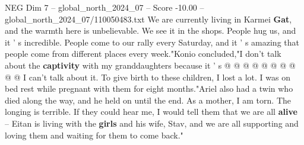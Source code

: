 \begin{textsample}{NEG Dim 7 – global\_north\_2024\_07 – Score -10.00 – global\_north\_2024\_07/110050483.txt}
We are currently living in Karmei \textbf{Gat}, and the warmth here is unbelievable.
We see it in the shops.
People hug us, and it ' s incredible.
People come to our rally every Saturday, and it ' s amazing that people come from different places every week."Konio concluded,"I don't talk about the \textbf{captivity} with my granddaughters because it ' s @ @ @ @ @ @ @ @ @ @ I can't talk about it.
To give birth to these children, I lost a lot.
I was on bed rest while pregnant with them for eight months."Ariel also had a twin who died along the way, and he held on until the end.
As a mother, I am torn.
The longing is terrible.
If they could hear me, I would tell them that we are all \textbf{alive} -- Eitan is living with the \textbf{girls} and his wife, Stav, and we are all supporting and loving them and waiting for them to come back."

\end{textsample}

